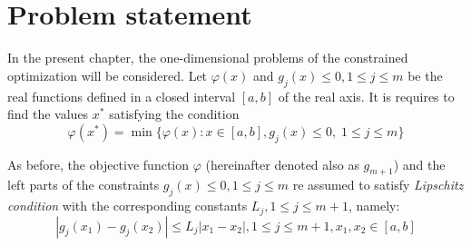 
\section{Problem statement}
In the present chapter, the one-dimensional problems of the constrained optimization will
be considered. Let $\varphi(x)$ and $g_j(x)\le 0,1\le j\le m$ be the real functions defined in a closed interval $[a,b]$ of the real axis. It is requires to find the values $x^*$ satisfying the condition
\begin{equation}
  \label{eq4:problem}
  \varphi(x^*)=\min\{\varphi(x):x\in [a,b], g_j(x)\le 0,\; 1\le j\le m\}
\end{equation}

As before, the objective function $\varphi$ (hereinafter denoted also as $g_{m+1}$) and the left parts of the constraints $g_j(x)\le 0,1\le j\le m$ re assumed to satisfy \emph{Lipschitz condition} with the corresponding constants $L_j,1\le j\le m+1$, namely:
\begin{equation}
  \label{eq4:lip_condition}
  |g_j(x_1)-g_j(x_2)|\le L_j|x_1-x_2|,1\le j\le m+1,x_1,x_2\in [a,b]
\end{equation}


